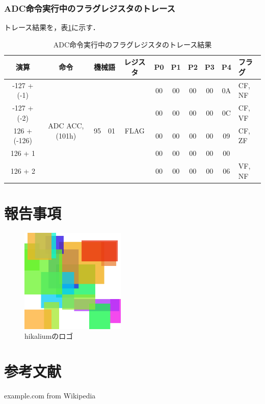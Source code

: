 \clearpage
\subsubsection{ADC命令実行中のフラグレジスタのトレース}
トレース結果を，表\ref{adctrace}に示す．

\begin{table}[htb]
\caption{ADC命令実行中のフラグレジスタのトレース結果}
\begin{center}
\begin{tabular}
{c|c|c|c|c|c|c|c|c|c|l}
\hline
演算 & 命令 & \multicolumn{2}{c|}{機械語} & レジスタ & P0 & P1 & P2 & P3 & P4 & フラグ  \\ \hline

-127 + (-1)&
\multirow{5}{*}{ADC ACC, (101h)}&
\multirow{5}{*}{95} & \multirow{5}{*}{01} 
		& \multirow{5}{*}{FLAG}	& 00 & 00 & 00 & 00 & 0A & CF, NF \\
\cline{1-1} \cline{6-11}

-127 + (-2) & & & & & 00 & 00 & 00 & 00 & 0C & CF, VF \\
\cline{1-1} \cline{6-11}
126 + (-126) & & & & & 00 & 00 & 00 & 00 & 09 & CF, ZF \\
\cline{1-1} \cline{6-11}
126 + 1 & & & & & 00 & 00 & 00 & 00 & 00 &  \\
\cline{1-1} \cline{6-11}
126 + 2 & & & & & 00 & 00 & 00 & 00 & 06 & VF, NF \\
\hline

\end{tabular}
\end{center}
\label{adctrace}
\end{table}


\section{報告事項}

\begin{figure}[p]
\centering
\includegraphics[height=5cm]{sample/logo.png}
\caption{hikaliumのロゴ}
\label{logo}
\end{figure}




\section{参考文献}
\begingroup
\renewcommand{\section}[2]{}
\begin{thebibliography}{3}
	 example.com from Wikipedia
\end{thebibliography}
\endgroup



